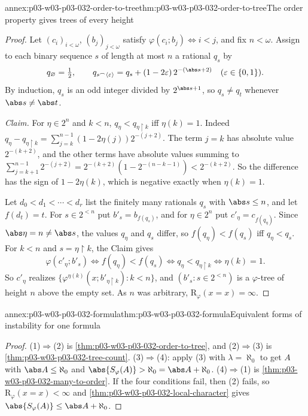 \begin{annexitem}{annex:p03-w03-p03-032-order-to-tree}{thm:p03-w03-p03-032-order-to-tree}{The order property gives trees of every height}
\begin{proof}
Let \((c_i)_{i<\omega}\), \((b_j)_{j<\omega}\) satisfy
\(\varphi(c_i;b_j)\Leftrightarrow i<j\), and fix \(n<\omega\).  Assign to
each binary sequence \(s\) of length at most \(n\) a rational \(q_s\) by
\[
  q_\varnothing=\tfrac12,\qquad
  q_{s^\frown\langle\varepsilon\rangle}=q_s+(1-2\varepsilon)\,2^{-(\abs s+2)}
  \quad(\varepsilon\in\{0,1\}).
\]
By induction, \(q_s\) is an odd integer divided by \(2^{\abs s+1}\), so
\(q_s\neq q_t\) whenever \(\abs s\neq\abs t\).

\emph{Claim.} For \(\eta\in2^n\) and \(k<n\),
\(q_\eta<q_{\eta\mathbin{\upharpoonright}k}\) iff \(\eta(k)=1\).  Indeed
\(q_\eta-q_{\eta\mathbin{\upharpoonright}k}
=\sum_{j=k}^{n-1}(1-2\eta(j))2^{-(j+2)}\).  The term \(j=k\) has absolute
value \(2^{-(k+2)}\), and the other terms have absolute values summing to
\(\sum_{j=k+1}^{n-1}2^{-(j+2)}=2^{-(k+2)}(1-2^{-(n-k-1)})<2^{-(k+2)}\).  So
the difference has the sign of \(1-2\eta(k)\), which is negative exactly
when \(\eta(k)=1\).

Let \(d_0<d_1<\cdots<d_r\) list the finitely many rationals \(q_s\) with
\(\abs s\leq n\), and let \(f(d_t)=t\).  For \(s\in2^{<n}\) put
\(b'_s=b_{f(q_s)}\), and for \(\eta\in2^n\) put
\(c'_\eta=c_{f(q_\eta)}\).  Since \(\abs\eta=n\neq\abs s\), the values
\(q_\eta\) and \(q_s\) differ, so \(f(q_\eta)<f(q_s)\) iff \(q_\eta<q_s\).
For \(k<n\) and \(s=\eta\mathbin{\upharpoonright}k\), the Claim gives
\[
  \varphi(c'_\eta;b'_s)
  \iff f(q_\eta)<f(q_s)
  \iff q_\eta<q_{\eta\mathbin{\upharpoonright}k}
  \iff \eta(k)=1 .
\]
So \(c'_\eta\) realizes
\(\{\varphi^{\eta(k)}(x;b'_{\eta\mathbin{\upharpoonright}k}):k<n\}\), and
\((b'_s:s\in2^{<n})\) is a \(\varphi\)-tree of height \(n\) above the empty
set.  As \(n\) was arbitrary, \(\mathrm R_\varphi(x=x)=\infty\).
\end{proof}
\end{annexitem}

\begin{annexitem}{annex:p03-w03-p03-032-formula}{thm:p03-w03-p03-032-formula}{Equivalent forms of instability for one formula}
\begin{proof}
(1)\(\Rightarrow\)(2) is \cref{thm:p03-w03-p03-032-order-to-tree}, and
(2)\(\Rightarrow\)(3) is \cref{thm:p03-w03-p03-032-tree-count}.
(3)\(\Rightarrow\)(4): apply (3) with \(\lambda=\aleph_0\) to get \(A\) with
\(\abs A\leq\aleph_0\) and \(\abs{S_\varphi(A)}>\aleph_0=\abs A+\aleph_0\).
(4)\(\Rightarrow\)(1) is \cref{thm:p03-w03-p03-032-many-to-order}.  If the
four conditions fail, then (2) fails, so
\(\mathrm R_\varphi(x=x)<\infty\) and
\cref{thm:p03-w03-p03-032-local-character} gives
\(\abs{S_\varphi(A)}\leq\abs A+\aleph_0\).
\end{proof}
\end{annexitem}

